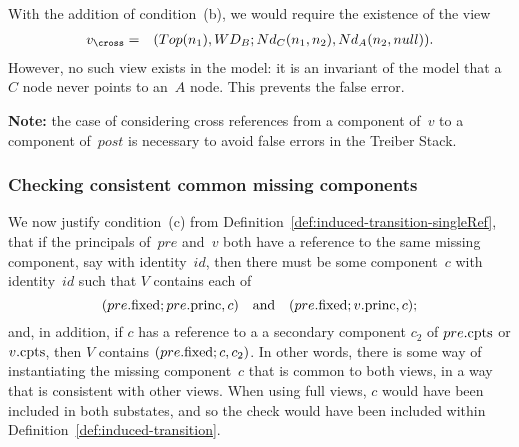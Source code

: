 With the addition of condition~(b), we would require the existence of the view
\begin{eqnarray*}
v_\cross & = &  (Top(n_1), WD_B ; Nd_C(n_1, n_2), Nd_A(n_2, null)).
\end{eqnarray*}
%
However, no such view exists in the model: it is an invariant of the model
that a $C$ node never points to an~$A$ node.  This prevents the false error.


\textbf{Note:} the case of considering cross references from a component
of~$v$ to a component of~$post$ is necessary to avoid false errors in the
Treiber Stack.




\subsubsection{Checking consistent common missing components}
\label{ssec:missing-common}

We now justify condition~(c) from
Definition~\ref{def:induced-transition-singleRef}, that if the principals
of~$pre$ and~$v$ both have a reference to the same missing component, say with
identity~$id$, then there must be some component~$c$ with identity~$id$ such
that $V$ contains each of
\[
(pre.\mathrm{fixed}; pre.\mathrm{princ}, c) \quad\mbox{and}\quad (pre.\mathrm{fixed}; v.\mathrm{princ}, c);
\]
and, in addition, if $c$ has a reference to a a secondary component $c_2$ of
$pre.\mathrm{cpts}$ or $v.\mathrm{cpts}$, then $V$ contains $(pre.\mathrm{fixed}; c, c_2)$.
%
In other words, there is some way of instantiating the missing component~$c$
that is common to both views, in a way that is consistent with other views.
When using full views, $c$ would have been included in both substates, and so
the check would have been included within
Definition~\ref{def:induced-transition}.



